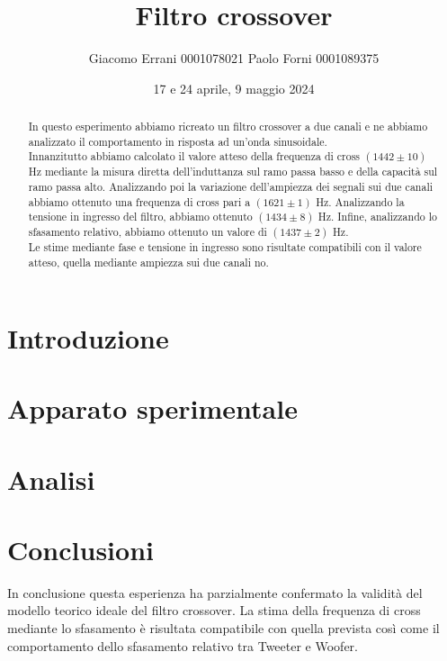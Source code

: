 \documentclass[12pt,a4paper]{article}
\title{Filtro crossover} %
\date{17 e 24 aprile, 9 maggio 2024}
\author{Giacomo Errani 0001078021 Paolo Forni 0001089375}
\newcommand{\theoryF}{ $(1442 \pm 10)$ Hz}
\newcommand{\amplitudeF}{$(1621 \pm 1)$ Hz}
\newcommand{\phaseF}{$(1437 \pm 2)$ Hz}
\newcommand{\vinF}{$(1434 \pm 8)$ Hz}
\begin{document}
\maketitle

\begin{abstract}

  In questo esperimento abbiamo ricreato un filtro crossover a due canali e ne abbiamo analizzato il comportamento
  in risposta ad un'onda sinusoidale. \\
  Innanzitutto abbiamo calcolato il valore atteso della frequenza di cross \theoryF \hspace{1pt} mediante la misura
  diretta dell'induttanza sul ramo passa basso e della capacità sul ramo passa alto.
  Analizzando poi la variazione dell'ampiezza dei segnali sui due canali abbiamo ottenuto una frequenza di cross pari a
  \amplitudeF.
  Analizzando la tensione in ingresso del filtro, abbiamo ottenuto \vinF.
  Infine, analizzando lo sfasamento relativo, abbiamo ottenuto un valore di \phaseF. \\
  Le stime mediante fase e tensione in ingresso sono risultate compatibili con il valore atteso, quella mediante
  ampiezza sui due canali no.

\end{abstract}


\section{Introduzione}\label{sec:introduzione}

  


\section{Apparato sperimentale}\label{sec:apparato-sperimentale}

  


\section{Analisi}\label{sec:analisi}

  

\section{Conclusioni}
In conclusione questa esperienza ha parzialmente confermato la validità del modello teorico ideale del filtro crossover. La stima della frequenza di cross mediante lo sfasamento è risultata compatibile con quella prevista così come il comportamento dello sfasamento relativo tra Tweeter e Woofer. 
\end{document}
